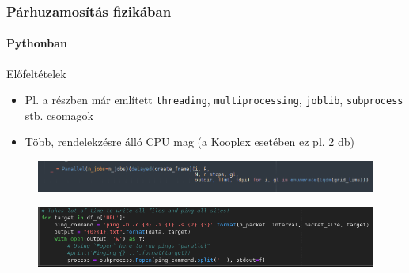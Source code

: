 \begin{frame}
\frametitle{Párhuzamosítás fizikában}
\framesubtitle{Pythonban}

\begin{exampleblock}{Előfeltételek}
	\begin{itemize}
		\item Pl. a részben már említett \texttt{threading}, \texttt{multiprocessing}, \texttt{joblib}, \texttt{subprocess} stb. csomagok
		\item Több, rendelekzésre álló CPU mag (a Kooplex esetében ez pl. 2 db)
	\end{itemize}
\end{exampleblock}

\begin{figure}
	\includegraphics[width=\textwidth]{img/python-joblib.png}
\end{figure}

\begin{figure}
	\includegraphics[width=\textwidth]{img/python-subprocess.png}
\end{figure}

\end{frame}